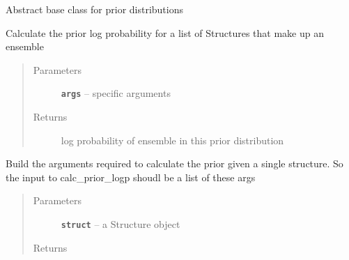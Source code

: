 \documentclass[letterpaper,10pt,english]{sphinxmanual}
\begin{document}
\begin{fulllineitems}
\label{modules:priors.BasePrior}
Abstract base class for prior distributions

\begin{fulllineitems}
\label{modules:priors.BasePrior.calc_prior_logp}
Calculate the prior log probability for a list of Structures that make
up an ensemble
\begin{quote}\begin{description}
\item[{Parameters}] \leavevmode
\textbf{\texttt{args}} -- specific arguments

\item[{Returns}] \leavevmode
log probability of ensemble in this prior distribution

\end{description}\end{quote}

\end{fulllineitems}


\begin{fulllineitems}
\label{modules:priors.BasePrior.get_arg}
Build the arguments required to calculate the prior given a
single structure. So the input to calc\_prior\_logp shoudl be a
list of these args
\begin{quote}\begin{description}
\item[{Parameters}] \leavevmode
\textbf{\texttt{struct}} -- a Structure object

\item[{Returns}] \leavevmode


\end{description}\end{quote}

\end{fulllineitems}


\end{fulllineitems}

\end{document}
